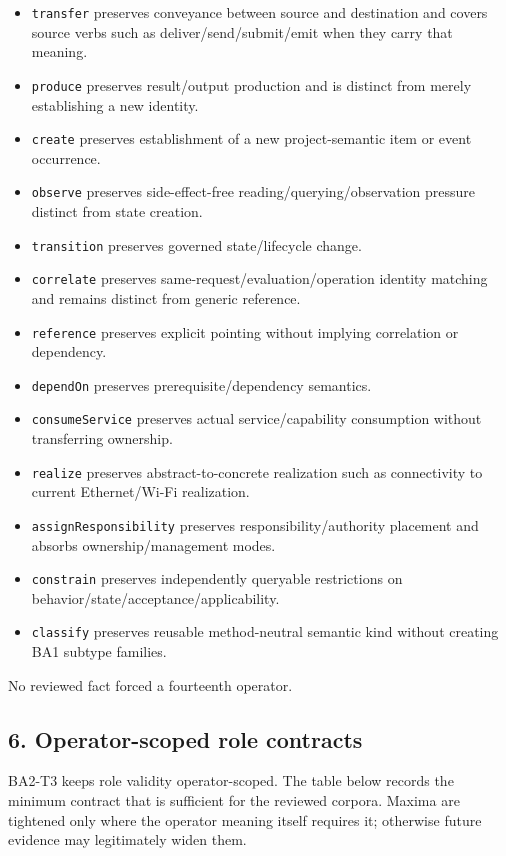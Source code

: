 \documentclass[
  10pt,
  a4paper,
]{article}
\providecommand{\tightlist}{%
  \setlength{\itemsep}{0pt}\setlength{\parskip}{0pt}}
\begin{document}
\begin{itemize}
\tightlist
\item
  \texttt{transfer} preserves conveyance between source and destination
  and covers source verbs such as deliver/send/submit/emit when they
  carry that meaning.
\item
  \texttt{produce} preserves result/output production and is distinct
  from merely establishing a new identity.
\item
  \texttt{create} preserves establishment of a new project-semantic item
  or event occurrence.
\item
  \texttt{observe} preserves side-effect-free
  reading/querying/observation pressure distinct from state creation.
\item
  \texttt{transition} preserves governed state/lifecycle change.
\item
  \texttt{correlate} preserves same-request/evaluation/operation
  identity matching and remains distinct from generic reference.
\item
  \texttt{reference} preserves explicit pointing without implying
  correlation or dependency.
\item
  \texttt{dependOn} preserves prerequisite/dependency semantics.
\item
  \texttt{consumeService} preserves actual service/capability
  consumption without transferring ownership.
\item
  \texttt{realize} preserves abstract-to-concrete realization such as
  connectivity to current Ethernet/Wi-Fi realization.
\item
  \texttt{assignResponsibility} preserves responsibility/authority
  placement and absorbs ownership/management modes.
\item
  \texttt{constrain} preserves independently queryable restrictions on
  behavior/state/acceptance/applicability.
\item
  \texttt{classify} preserves reusable method-neutral semantic kind
  without creating BA1 subtype families.
\end{itemize}

No reviewed fact forced a fourteenth operator.

\subsection{6. Operator-scoped role
contracts}\label{6-operator-scoped-role-contracts}

BA2-T3 keeps role validity operator-scoped. The table below records the
minimum contract that is sufficient for the reviewed corpora. Maxima are
tightened only where the operator meaning itself requires it; otherwise
future evidence may legitimately widen them.
\end{document}
